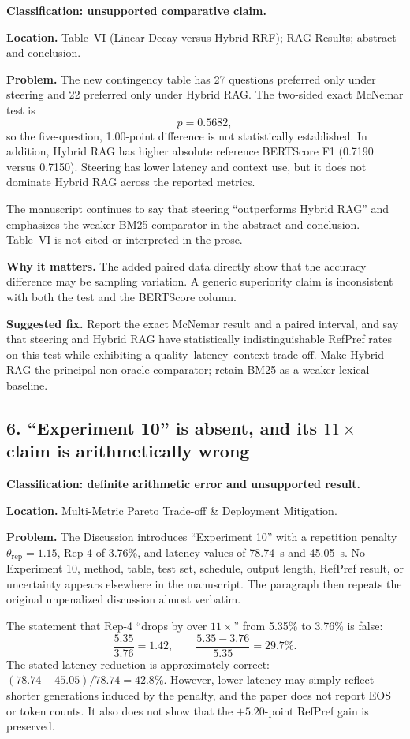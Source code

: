 \documentclass[11pt]{article}
\begin{document}
\textbf{Classification: unsupported comparative claim.}

\textbf{Location.} Table~VI (Linear Decay versus Hybrid RRF); RAG Results; abstract and conclusion.

\textbf{Problem.} The new contingency table has 27 questions preferred only under steering and 22 preferred only under Hybrid RAG.  The two-sided exact McNemar test is
\[
 p=0.5682,
\]
so the five-question, 1.00-point difference is not statistically established.  In addition, Hybrid RAG has higher absolute reference BERTScore F1 (0.7190 versus 0.7150).  Steering has lower latency and context use, but it does not dominate Hybrid RAG across the reported metrics.

The manuscript continues to say that steering ``outperforms Hybrid RAG'' and emphasizes the weaker BM25 comparator in the abstract and conclusion.  Table~VI is not cited or interpreted in the prose.

\textbf{Why it matters.} The added paired data directly show that the accuracy difference may be sampling variation.  A generic superiority claim is inconsistent with both the test and the BERTScore column.

\textbf{Suggested fix.} Report the exact McNemar result and a paired interval, and say that steering and Hybrid RAG have statistically indistinguishable RefPref rates on this test while exhibiting a quality--latency--context trade-off.  Make Hybrid RAG the principal non-oracle comparator; retain BM25 as a weaker lexical baseline.

\subsection*{6. ``Experiment 10'' is absent, and its $11\times$ claim is arithmetically wrong}

\textbf{Classification: definite arithmetic error and unsupported result.}

\textbf{Location.} Multi-Metric Pareto Trade-off \& Deployment Mitigation.

\textbf{Problem.} The Discussion introduces ``Experiment 10'' with a repetition penalty $\theta_{\text{rep}}=1.15$, Rep-4 of 3.76\%, and latency values of 78.74~s and 45.05~s.  No Experiment 10, method, table, test set, schedule, output length, RefPref result, or uncertainty appears elsewhere in the manuscript.  The paragraph then repeats the original unpenalized discussion almost verbatim.

The statement that Rep-4 ``drops by over $11\times$'' from 5.35\% to 3.76\% is false:
\[
 \frac{5.35}{3.76}=1.42,
 \qquad
 \frac{5.35-3.76}{5.35}=29.7\%.
\]
The stated latency reduction is approximately correct: $(78.74-45.05)/78.74=42.8\%$.  However, lower latency may simply reflect shorter generations induced by the penalty, and the paper does not report EOS or token counts.  It also does not show that the $+5.20$-point RefPref gain is preserved.
\end{document}
